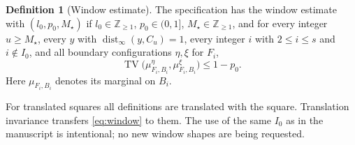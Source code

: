 \documentclass[11pt]{amsart}
\theoremstyle{definition}
\newtheorem{definition}[theorem]{Definition}
\newcommand{\Z}{\mathbb Z}
\newcommand{\TV}{\operatorname{TV}}
\newcommand{\dist}{\operatorname{dist}_\infty}
\newcommand{\1}{\mathbf 1}
\begin{document}
\begin{definition}[Window estimate]
\label{def:window}
The specification has the window estimate with
$(l_0,p_0,M_\star)$ if $l_0\in\Z_{\ge1}$, $p_0\in(0,1]$,
$M_\star\in\Z_{\ge1}$, and for every integer $u\ge M_\star$, every $y$
with $\dist(y,C_u)=1$, every integer $i$ with $2\le i\le s$ and
$i\notin I_0$, and all boundary configurations $\eta,\xi$ for $F_i$,
\begin{equation}\label{eq:window}
 \TV\bigl(\mu_{F_i,B_i}^{\eta},\mu_{F_i,B_i}^{\xi}\bigr)\le1-p_0.
\end{equation}
Here $\mu_{F_i,B_i}$ denotes its marginal on $B_i$.
\end{definition}

For translated squares all definitions are translated with the square.
Translation invariance transfers \eqref{eq:window} to them. The use of the
same $I_0$ as in the manuscript is intentional; no new window shapes are
being requested.
\end{document}
